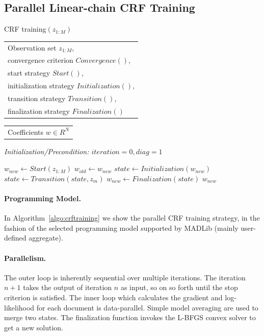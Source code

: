 \documentclass[11pt,letterpaper]{article}
\newlength{\alglabelwidth}
\newcommand{\alginput}[1]{%
\par\noindent%
\settowidth{\alglabelwidth}{\emph{Output:}}%
\makebox[\alglabelwidth][l]{\emph{Input:}} \begin{tabular}[t]{l} #1 \end{tabular}}
\newcommand{\algoutput}[1]{%
\par\noindent%
\settowidth{\alglabelwidth}{\emph{Output:}}%
\makebox[\alglabelwidth][l]{\emph{Output:}} \begin{tabular}[t]{l} #1 \end{tabular}}
\newcommand{\algprecond}[1]{%
\par\noindent\textit{Initialization/Precondition: #1}}
\begin{document}
\subsection{Parallel Linear-chain CRF Training}
\begin{algorithm} 
\caption{CRF training$(z_{1:M})$} \label{alg:CRF training}
\alginput{Observation set $z_{1:M}$,\\
convergence criterion $\mathit{Convergence}()$,\\
start strategy $\mathit{Start}()$,\\
initialization strategy $\mathit{Initialization}()$,\\
transition strategy $\mathit{Transition}()$,\\
finalization strategy $\mathit{Finalization}()$}
\algoutput{Coefficients $w \in R^N$}
\algprecond{$iteration = 0, diag = 1$}
\begin{algorithmic}[1]
\State $w_{new} \gets \mathit{Start}(z_{1:M})$
\Repeat
        \State $w_{old} \gets w_{new}$
        \State $\mathit{state} \gets \mathit{Initialization}(w_{new})$
 
\State $\mathit{state} \gets \mathit{Transition}(\mathit{state}, z_m)$
\EndFor
\State $w_{new} \gets Finalization(\mathit{state})$ 
    \State \Return $w_{new}$
\end{algorithmic}
\label{algo:crftraining}
\end{algorithm}

\paragraph{Programming Model.}
In Algorithm~\ref{algo:crftraining} we show the parallel CRF training strategy, in the fashion of the selected programming model supported by MADLib (mainly user-defined aggregate).

\paragraph{Parallelism.}
The outer loop is inherently sequential over multiple iterations.
The iteration $n+1$ takes the output of iteration $n$ as input, so on so forth until the stop criterion is satisfied.
The inner loop which calculates the gradient and log-likelihood for each document is data-parallel.
Simple model averaging are used to merge two states.
The finalization function invokes the L-BFGS convex solver to get a new solution. 
\end{document}

